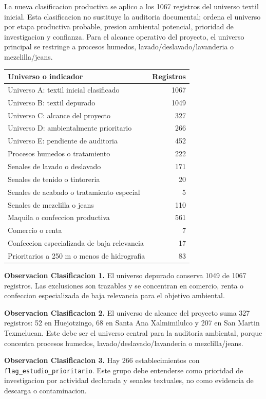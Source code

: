 \documentclass[11pt,letterpaper]{article}
\begin{document}
La nueva clasificacion productiva se aplico a los 1067 registros del universo textil inicial. Esta clasificacion no sustituye la auditoria documental; ordena el universo por etapa productiva probable, presion ambiental potencial, prioridad de investigacion y confianza. Para el alcance operativo del proyecto, el universo principal se restringe a procesos humedos, lavado/deslavado/lavanderia o mezclilla/jeans.

\begin{longtable}{p{8cm}r}
\toprule
Universo o indicador & Registros \\
\midrule
Universo A: textil inicial clasificado & 1067 \\
Universo B: textil depurado & 1049 \\
Universo C: alcance del proyecto & 327 \\
Universo D: ambientalmente prioritario & 266 \\
Universo E: pendiente de auditoria & 452 \\
Procesos humedos o tratamiento & 222 \\
Senales de lavado o deslavado & 171 \\
Senales de tenido o tintoreria & 20 \\
Senales de acabado o tratamiento especial & 5 \\
Senales de mezclilla o jeans & 110 \\
Maquila o confeccion productiva & 561 \\
Comercio o renta & 7 \\
Confeccion especializada de baja relevancia & 17 \\
Prioritarios a 250 m o menos de hidrografia & 83 \\
\bottomrule
\end{longtable}

\textbf{Observacion Clasificacion 1.} El universo depurado conserva 1049 de 1067 registros. Las exclusiones son trazables y se concentran en comercio, renta o confeccion especializada de baja relevancia para el objetivo ambiental.

\textbf{Observacion Clasificacion 2.} El universo de alcance del proyecto suma 327 registros: 52 en Huejotzingo, 68 en Santa Ana Xalmimilulco y 207 en San Martin Texmelucan. Este debe ser el universo central para la auditoria ambiental, porque concentra procesos humedos, lavado/deslavado/lavanderia o mezclilla/jeans.

\textbf{Observacion Clasificacion 3.} Hay 266 establecimientos con \texttt{flag\_estudio\_prioritario}. Este grupo debe entenderse como prioridad de investigacion por actividad declarada y senales textuales, no como evidencia de descarga o contaminacion.
\end{document}
